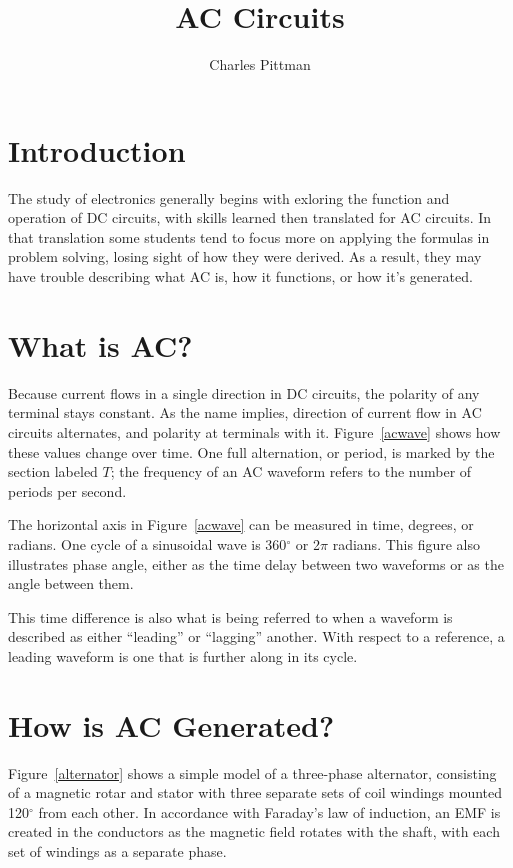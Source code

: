 \documentclass{article}
\author{Charles Pittman}
\title{AC Circuits}
\begin{document}
  \maketitle


  \section*{Introduction}
  The study of electronics generally begins with exloring the function and
  operation of \ac{DC} circuits, with skills learned then translated for
  \ac{AC} circuits.  In that translation some students tend to focus more on
  applying the formulas in problem solving, losing sight of how they were
  derived.  As a result, they may have trouble describing what \ac{AC} is, how
  it functions, or how it's generated.

  \section*{What is \ac{AC}?}
  Because current flows in a single direction in \ac{DC} circuits, the polarity
  of any terminal stays constant.  As the name implies, direction of current
  flow in \ac{AC} circuits alternates, and polarity at terminals with it.
  Figure~\ref{acwave} shows how these values change over time.  One full
  alternation, or period, is marked by the section labeled $T$; the frequency
  of an \ac{AC} waveform refers to the number of periods per second.

  The horizontal axis in Figure~\ref{acwave} can be measured in time, degrees,
  or radians.  One cycle of a sinusoidal wave is 360$^\circ$ or 2$\pi$ radians.
  This figure also illustrates phase angle, either as the time delay between
  two waveforms or as the angle between them.

  This time difference is also what is being referred to when a waveform is
  described as either ``leading'' or ``lagging'' another.  With respect to a
  reference, a leading waveform is one that is further along in its cycle.

  \section*{How is \ac{AC} Generated?}
  Figure~\ref{alternator} shows a simple model of a three-phase alternator,
  consisting of a magnetic rotar and stator with three separate sets of coil
  windings mounted 120$^\circ$ from each other.  In accordance with Faraday's
  law of induction, an \ac{EMF} is created in the conductors as the magnetic
  field rotates with the shaft, with each set of windings as a separate phase.
\end{document}
